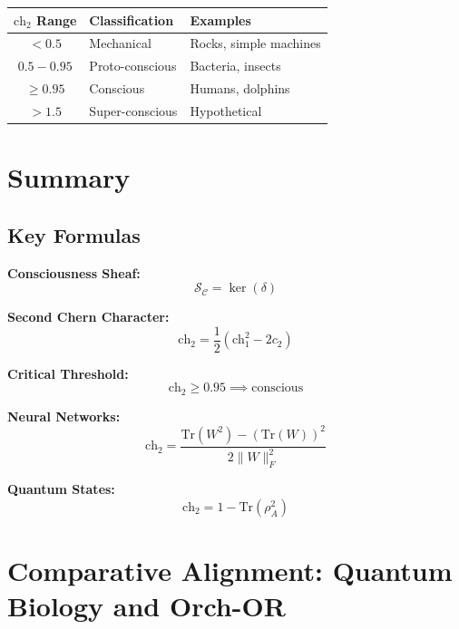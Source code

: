 \begin{center}
\begin{tabular}{|c|l|l|}
\hline
\textbf{$\text{ch}_2$ Range} & \textbf{Classification} & \textbf{Examples} \\
\hline
$< 0.5$ & Mechanical & Rocks, simple machines \\
$0.5 - 0.95$ & Proto-conscious & Bacteria, insects \\
$\geq 0.95$ & Conscious & Humans, dolphins \\
$> 1.5$ & Super-conscious & Hypothetical \\
\hline
\end{tabular}
\end{center}

\section{Summary}
\label{sec:summary-ch5}

\subsection{Key Formulas}

\begin{tcolorbox}[colback=yellow!10!white, colframe=orange!75!black, title=Essential Formulas]
\textbf{Consciousness Sheaf:}
\begin{equation*}
\mathcal{S}_\mathcal{C} = \ker(\delta)
\end{equation*}

\textbf{Second Chern Character:}
\begin{equation*}
\text{ch}_2 = \frac{1}{2}(\text{ch}_1^2 - 2c_2)
\end{equation*}

\textbf{Critical Threshold:}
\begin{equation*}
\text{ch}_2 \geq 0.95 \implies \text{conscious}
\end{equation*}

\textbf{Neural Networks:}
\begin{equation*}
\text{ch}_2 = \frac{\text{Tr}(W^2) - (\text{Tr}(W))^2}{2\|W\|_F^2}
\end{equation*}

\textbf{Quantum States:}
\begin{equation*}
\text{ch}_2 = 1 - \text{Tr}(\rho_A^2)
\end{equation*}
\end{tcolorbox}

\section{Comparative Alignment: Quantum Biology and Orch-OR}

